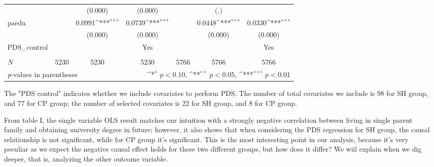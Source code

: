 \documentclass[]{AEA}
\def\sym#1{\ifmmode^{#1}\else\(^{#1}\)\fi}
\begin{document}
\begin{center}
\begin{table}
\begin{tabular}{l*{6}c}
                &                     &     (0.000)         &     (0.000)         &                     &         (.)         &                     \\
    [1em]
    paedu       &                     &      0.0991\sym{***}&      0.0739\sym{***}&                     &      0.0448\sym{***}&      0.0330\sym{***}\\
                &                     &     (0.000)         &     (0.000)         &                     &     (0.000)         &     (0.000)         \\
    [1em]
    PDS\_control  &   &  &  Yes    &  &    &  Yes \\
    &   &      &      &   &      &      \\
    \hline
    \(N\)       &        5230         &        5230         &        5230         &        5766         &        5766         &        5766         \\
    \bottomrule
    \multicolumn{3}{l}{\footnotesize \textit{p}-values in parentheses} & \multicolumn{4}{r}{\footnotesize \sym{*} \(p<0.10\), \sym{**} \(p<0.05\), \sym{***} \(p<0.01\)}\\
    \end{tabular}
    \begin{tablenotes}
        The "PDS control" indicates whether we include covariates to perform PDS.  The number of total covariates we include is 98 for SH group, and 77 for CP group; the number of selected covariates is 22 for SH group, and 8 for CP group.
    \end{tablenotes}
    \end{table}
    \end{center}

    From table I, the single variable OLS result matches our intuition with a strongly negative correlation between living in single parent family and obtaining university degree in future; however, it also shows that when considering the PDS regression for SH group, the causal relationship is not significant, while for CP group it's significant.  This is the most interesting point in our analysis, because it's very peculiar as we expect the negative causal effect holds for these two different groups, but how does it differ?  We wiil explain when we dig deeper, that is, analyzing the other outcome variable.
\end{document}

